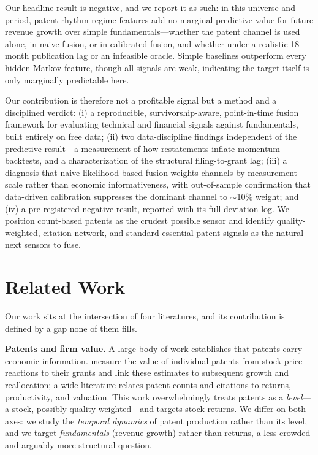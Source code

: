 \documentclass[11pt]{article}
\begin{document}
Our headline result is negative, and we report it as such: in this universe and period, patent-rhythm regime features add no marginal predictive value for future revenue growth over simple fundamentals---whether the patent channel is used alone, in naive fusion, or in calibrated fusion, and whether under a realistic 18-month publication lag or an infeasible oracle. Simple baselines outperform every hidden-Markov feature, though all signals are weak, indicating the target itself is only marginally predictable here.

Our contribution is therefore not a profitable signal but a method and a disciplined verdict: (i) a reproducible, survivorship-aware, point-in-time fusion framework for evaluating technical and financial signals against fundamentals, built entirely on free data; (ii) two data-discipline findings independent of the predictive result---a measurement of how restatements inflate momentum backtests, and a characterization of the structural filing-to-grant lag; (iii) a diagnosis that naive likelihood-based fusion weights channels by measurement scale rather than economic informativeness, with out-of-sample confirmation that data-driven calibration suppresses the dominant channel to $\sim$10\% weight; and (iv) a pre-registered negative result, reported with its full deviation log. We position count-based patents as the crudest possible sensor and identify quality-weighted, citation-network, and standard-essential-patent signals as the natural next sensors to fuse.

\section{Related Work}

Our work sits at the intersection of four literatures, and its contribution is defined by a gap none of them fills.

\textbf{Patents and firm value.} A large body of work establishes that patents carry economic information. \citet{kogan2017} measure the value of individual patents from stock-price reactions to their grants and link these estimates to subsequent growth and reallocation; a wide literature relates patent counts and citations to returns, productivity, and valuation. This work overwhelmingly treats patents as a \emph{level}---a stock, possibly quality-weighted---and targets stock returns. We differ on both axes: we study the \emph{temporal dynamics} of patent production rather than its level, and we target \emph{fundamentals} (revenue growth) rather than returns, a less-crowded and arguably more structural question.
\end{document}
